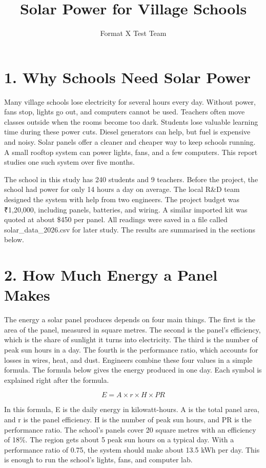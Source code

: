 \documentclass{article}
\title{Solar Power for Village Schools}
\author{Format X Test Team}
\begin{document}
\maketitle

\section*{1. Why Schools Need Solar Power}

Many village schools lose electricity for several hours every day.
Without power, fans stop, lights go out, and computers cannot be used.
Teachers often move classes outside when the rooms become too dark.
Students lose valuable learning time during these power cuts.
Diesel generators can help, but fuel is expensive and noisy.
Solar panels offer a cleaner and cheaper way to keep schools running.
A small rooftop system can power lights, fans, and a few computers.
This report studies one such system over five months.

The school in this study has 240 students and 9 teachers.
Before the project, the school had power for only 14 hours a day on average.
The local R\&D team designed the system with help from two engineers.
The project budget was ₹1,20,000, including panels, batteries, and wiring.
A similar imported kit was quoted at about \$450 per panel.
All readings were saved in a file called solar\_data\_2026.csv for later study.
The results are summarised in the sections below.

\section*{2. How Much Energy a Panel Makes}

The energy a solar panel produces depends on four main things.
The first is the area of the panel, measured in square metres.
The second is the panel's efficiency, which is the share of sunlight it turns into electricity.
The third is the number of peak sun hours in a day.
The fourth is the performance ratio, which accounts for losses in wires, heat, and dust.
Engineers combine these four values in a simple formula.
The formula below gives the energy produced in one day.
Each symbol is explained right after the formula.

\begin{equation}
E = A \times r \times H \times PR
\label{eq:1}
\end{equation}

In this formula, E is the daily energy in kilowatt-hours.
A is the total panel area, and r is the panel efficiency.
H is the number of peak sun hours, and PR is the performance ratio.
The school's panels cover 20 square metres with an efficiency of 18\%.
The region gets about 5 peak sun hours on a typical day.
With a performance ratio of 0.75, the system should make about 13.5 kWh per day.
This is enough to run the school's lights, fans, and computer lab.
\end{document}
